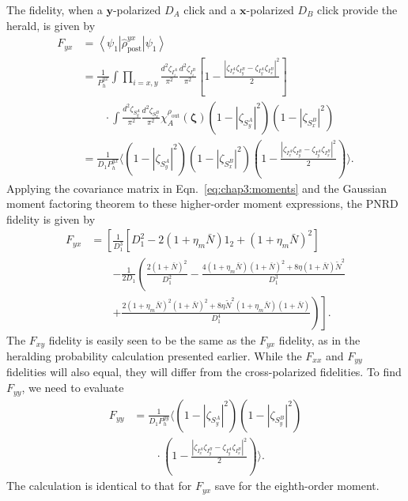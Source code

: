 \documentclass[aps,twocolumn,secnumarabic,amsmath,amssymb,pra,groupedaddress,
showpacs, showkeys]{revtex4-1}
\newcommand{\bra}[1]{\left\langle #1 \right|}
\newcommand{\ket}[1]{\left|#1\right\rangle}
\newcommand{\pna}[1]{\left(#1\right)}
\newcommand{\pnb}[1]{\left[#1\right]}
\begin{document}
The fidelity, when a $\mathbf{y}$-polarized $D_A$ click and a
$\mathbf{x}$-polarized $D_B$ click provide the herald, is given by
\begin{align}
F_{yx} & = \bra{\psi_{1}} \hat{\rho}_{\textrm{post}}^{yx} \ket{\psi_1} \nonumber \\
& =\frac{1}{P_{h}^{yx}}\int 
\prod_{i=x,y}\frac{d^2 \zeta_{I_i^A}}{\pi^2} 
\frac{d^2 \zeta_{I_i^B}}{\pi^2} 
\pnb{1-\frac{|\zeta_{I_x^A}\zeta_{I_y^B}-\zeta_{I_y^A}\zeta_{I_x^B}|^2}{2}}  \nonumber \\
& \qquad \cdot \int 
\frac{d^2 \zeta_{S_y^A}}{\pi^2} 
\frac{d^2 \zeta_{S_x^B}}{\pi^2}
\chi_A^{\rho_{\textrm{out}}}\pna{\bm{\zeta}} 
\pna{1-|\zeta_{S_y^A}|^2}\pna{1-|\zeta_{S_x^B}|^2} \nonumber \\
& = \frac{1}{D_1 P_{h}^{yx}}\langle \pna{1-|\zeta_{S_y^A}|^2}\pna{1-|\zeta_{S_x^B}|^2}\pna{1-\frac{|\zeta_{I_x^A}\zeta_{I_y^B}-\zeta_{I_y^A}\zeta_{I_x^B}|^2}{2}}  \rangle.
\end{align}
Applying the covariance matrix in Eqn.~\ref{eq:chap3:moments} and the Gaussian
moment factoring theorem to these higher-order moment expressions, the PNRD
fidelity is given by
\begin{align}
F_{yx}&=\left[\frac{1}{D_1^3}\pnb{D_1^2-2\pna{1+\eta_{m}\bar{N}}1_2+\pna{1+\eta_{m}\bar{N}}^2}\right.\nonumber\\
& \qquad \left.-\frac{1}{2D_1} \left(\frac{2\pna{1+\bar{N}}^2}{D_1^2}-\frac{4\pna{1+\eta_{m}\bar{N}}\pna{1+\bar{N}}^2+8\eta\pna{1+\bar{N}}\tilde{N}^2}{D_1^3}\right.\right.\nonumber\\
& \qquad \left.\left.+\frac{2\pna{1+\eta_{m}\bar{N}}^2\pna{1+\bar{N}}^2 +8 \eta \tilde{N}^2 \pna{1 + \eta_{m} \bar{N}} \pna{1 + \bar{N}}}{D_1^4}\right)\right].
\end{align}
The $F_{xy}$ fidelity is easily seen to be the same as the $F_{yx}$ fidelity,
as in the heralding probability calculation presented earlier. While the
$F_{xx}$ and $F_{yy}$ fidelities will also equal, they will differ from the
cross-polarized fidelities. To find $F_{yy}$, we need to evaluate
\begin{align}
F_{yy} & = \frac{1}{D_1 P_{h}^{yy}}\langle
\pna{1-|\zeta_{S_y^A}|^2}\pna{1-|\zeta_{S_y^B}|^2}\nonumber \\ & \qquad \cdot\pna{1-\frac{|\zeta_{I_x^A}\zeta_{I_y^B}-\zeta_{I_y^A}\zeta_{I_x^B}|^2}{2}}  \rangle.
\end{align}
The calculation is identical to that for $F_{yx}$ save for the eighth-order
moment.
\end{document}
